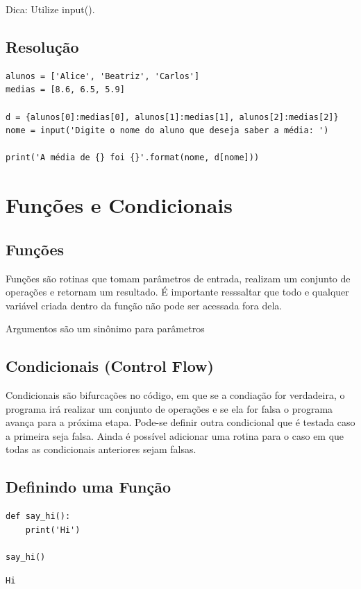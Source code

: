 \documentclass[presentation]{beamer}
\begin{document}
Dica: Utilize input().
\subsection{Resolução}
\label{sec:orgheadline64}
\begin{verbatim}
alunos = ['Alice', 'Beatriz', 'Carlos']
medias = [8.6, 6.5, 5.9]

d = {alunos[0]:medias[0], alunos[1]:medias[1], alunos[2]:medias[2]}
nome = input('Digite o nome do aluno que deseja saber a média: ')

print('A média de {} foi {}'.format(nome, d[nome]))
\end{verbatim}


\section{Funções e Condicionais}
\label{sec:orgheadline78}
\subsection{Funções}
\label{sec:orgheadline66}
Funções são rotinas que tomam parâmetros de entrada, realizam um conjunto de operações e retornam um resultado. É importante resssaltar que todo e qualquer variável criada dentro da função não pode ser acessada fora dela.

Argumentos são um sinônimo para parâmetros
\subsection{Condicionais (Control Flow)}
\label{sec:orgheadline67}
Condicionais são bifurcações no código, em que se a condiação for verdadeira, o programa irá realizar um conjunto de operações e se ela for falsa o programa avança para a próxima etapa. Pode-se definir outra condicional que é testada caso a primeira seja falsa. Ainda é possível adicionar uma rotina para o caso em que todas as condicionais anteriores sejam falsas.
\subsection{Definindo uma Função}
\label{sec:orgheadline68}
\begin{verbatim}
def say_hi():
    print('Hi')

say_hi()
\end{verbatim}

\begin{verbatim}
Hi
\end{verbatim}
\end{document}

